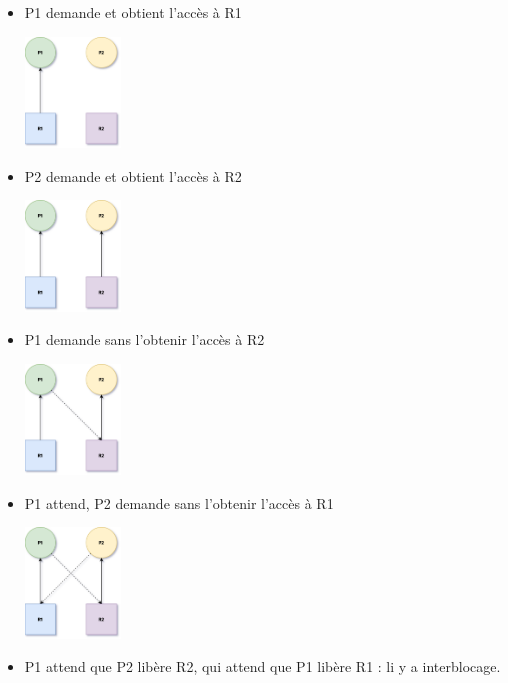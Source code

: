 \documentclass[10pt,firamath,cours]{nsi}
\begin{document}
\begin{itemize}
\item 	P1 demande et obtient l'accès à R1 \begin{center}\includegraphics[width=0.2\textwidth]{img/inter2}\end{center}
\item 	P2 demande et obtient l'accès à R2\begin{center}\includegraphics[width=0.2\textwidth]{img/inter3}\end{center}
\item 	P1 demande sans l'obtenir l'accès à R2\begin{center}\includegraphics[width=0.2\textwidth]{img/inter4}\end{center}
\item 	P1 attend, P2 demande sans l'obtenir l'accès à R1\begin{center}\includegraphics[width=0.2\textwidth]{img/inter5}\end{center}
\item 	P1 attend que P2 libère R2, qui attend que P1 libère R1 : li y a interblocage.
\end{itemize}
\end{document}
